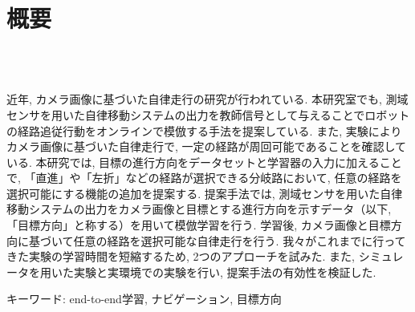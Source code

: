 \chapter*{概要}
\thispagestyle{empty}
%
\begin{center}
  \scalebox{1.5}{視覚と行動のend-to-end学習により}\\
  \scalebox{1.5}{経路追従行動をオンラインで模倣する手法の提案}\\
  \scalebox{1.5}{（目標方向による経路選択機能の追加と検証）}
\end{center}
\vspace{1.0zh}
%
\par
近年, カメラ画像に基づいた自律走行の研究が行われている. 本研究室でも, 測域センサを用いた自律移動システムの出力を教師信号として与えることでロボットの経路追従行動をオンラインで模倣する手法を提案している. また, 実験によりカメラ画像に基づいた自律走行で, 一定の経路が周回可能であることを確認している. 本研究では, 目標の進行方向をデータセットと学習器の入力に加えることで, 「直進」や「左折」などの経路が選択できる分岐路において, 任意の経路を選択可能にする機能の追加を提案する. 提案手法では, 測域センサを用いた自律移動システムの出力をカメラ画像と目標とする進行方向を示すデータ（以下, 「目標方向」と称する）を用いて模倣学習を行う. 学習後, カメラ画像と目標方向に基づいて任意の経路を選択可能な自律走行を行う. 
我々がこれまでに行ってきた実験の学習時間を短縮するため, 2つのアプローチを試みた. 
また, シミュレータを用いた実験と実環境での実験を行い, 提案手法の有効性を検証した. 

キーワード: end-to-end学習, ナビゲーション, 目標方向
%
\newpage
